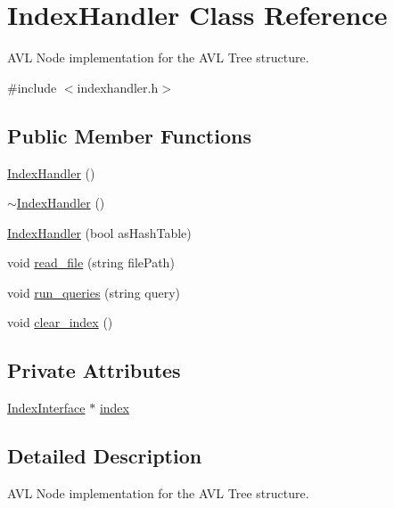 \hypertarget{class_index_handler}{}\section{Index\+Handler Class Reference}
\label{class_index_handler}


A\+V\+L Node implementation for the A\+V\+L Tree structure.  




{\ttfamily \#include $<$indexhandler.\+h$>$}

\subsection*{Public Member Functions}
\begin{DoxyCompactItemize}
\item 
\hyperlink{class_index_handler_a27748387661142a2eb545be6f0499996}{Index\+Handler} ()
\item 
\hyperlink{class_index_handler_ad787ca8cf83345ecfe332d2c3b8f8009}{$\sim$\+Index\+Handler} ()
\item 
\hyperlink{class_index_handler_ae50be3bec7e5ad3ede66110535043e15}{Index\+Handler} (bool as\+Hash\+Table)
\item 
void \hyperlink{class_index_handler_a3fe9b3c1b3df7eea7e4ae590df4a4339}{read\+\_\+file} (string file\+Path)
\item 
void \hyperlink{class_index_handler_acee974285412a635c3c31fe86b9e0fb8}{run\+\_\+queries} (string query)
\item 
void \hyperlink{class_index_handler_a417830272cfc725f6966c7a0a0ceae1d}{clear\+\_\+index} ()
\end{DoxyCompactItemize}
\subsection*{Private Attributes}
\begin{DoxyCompactItemize}
\item 
\hyperlink{class_index_interface}{Index\+Interface} $\ast$ \hyperlink{class_index_handler_aa30663ff8e3b52b43ce35ebb2d12752c}{index}
\end{DoxyCompactItemize}


\subsection{Detailed Description}
A\+V\+L Node implementation for the A\+V\+L Tree structure. 

